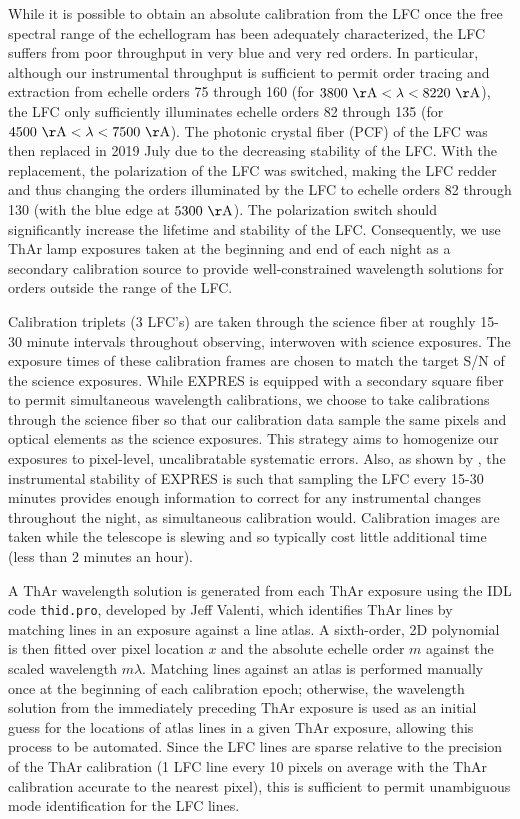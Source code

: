 While it is possible to obtain an absolute calibration from the LFC once the free spectral range of the echellogram has been adequately characterized, the LFC suffers from poor throughput in very blue and very red orders. In particular, although our instrumental throughput is sufficient to permit order tracing and extraction from echelle orders 75 through 160 (for $3800\unit{\AA}<\lambda<8220\unit{\AA}$), the LFC only sufficiently illuminates echelle orders 82 through 135 (for $4500\unit{\AA}<\lambda<7500\unit{\AA}$). The photonic crystal fiber (PCF) of the LFC was then replaced in 2019 July due to the decreasing stability of the LFC. With the replacement, the polarization of the LFC was switched, making the LFC redder and thus changing the orders illuminated by the LFC to echelle orders 82 through 130 (with the blue edge at \(5300\unit{\AA}\)). The polarization switch should significantly increase the lifetime and stability of the LFC. Consequently, we use ThAr lamp exposures taken at the beginning and end of each night as a secondary calibration source to provide well-constrained wavelength solutions for orders outside the range of the LFC.

Calibration triplets (3 LFC's) are taken through the science fiber at roughly 15-30 minute intervals throughout observing, interwoven with science exposures. The exposure times of these calibration frames are chosen to match the target S/N of the science exposures. While EXPRES is equipped with a secondary square fiber to permit simultaneous wavelength calibrations, we choose to take calibrations through the science fiber so that our calibration data sample the same pixels and optical elements as the science exposures.  This strategy aims to homogenize our exposures to pixel-level, uncalibratable systematic errors. Also, as shown by \citet{blackman_performance_2020}, the instrumental stability of EXPRES is such that sampling the LFC every 15-30 minutes provides enough information to correct for any instrumental changes throughout the night, as simultaneous calibration would. Calibration images are taken while the telescope is slewing and so typically cost little additional time (less than 2 minutes an hour).

A ThAr wavelength solution is generated from each ThAr exposure using the IDL code \texttt{thid.pro}, developed by Jeff Valenti, which identifies ThAr lines by matching lines in an exposure against a line atlas. A sixth-order, 2D polynomial is then fitted over pixel location \(x\) and the absolute echelle order \(m\) against the scaled wavelength \(m\lambda\). Matching lines against an atlas is performed manually once at the beginning of each calibration epoch; otherwise, the wavelength solution from the immediately preceding ThAr exposure is used as an initial guess for the locations of atlas lines in a given ThAr exposure, allowing this process to be automated. Since the LFC lines are sparse relative to the precision of the ThAr calibration (1 LFC line every 10 pixels on average with the ThAr calibration accurate to the nearest pixel), this is sufficient to permit unambiguous mode identification for the LFC lines.

